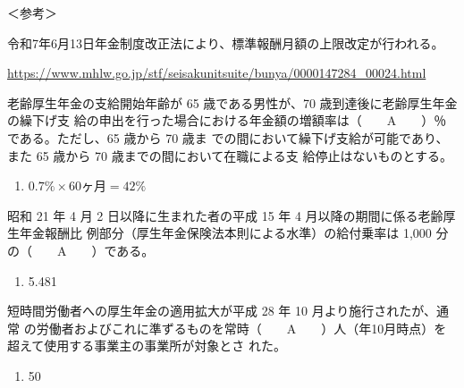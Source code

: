 \begin{explanationbox}
  ＜参考＞

  令和7年6月13日年金制度改正法により、標準報酬月額の上限改定が行われる。

  \url{https://www.mhlw.go.jp/stf/seisakunitsuite/bunya/0000147284_00024.html}
\end{explanationbox}

\begin{fillblank}[年金1 H28 問題1(2)F]
  老齢厚生年金の支給開始年齢が 65 歳である男性が、70 歳到達後に老齢厚生年金の繰下げ支
給の申出を行った場合における年金額の増額率は（　　A　　）％である。ただし、65 歳から 70 歳ま
での間において繰下げ支給が可能であり、また 65 歳から 70 歳までの間において在職による支
給停止はないものとする。
\end{fillblank}

\begin{answerbox}
  \begin{enumerate}[A: ]
    \item $0.7\% \times 60ヶ月 = 42\%$
  \end{enumerate}
\end{answerbox}

\begin{fillblank}[年金1 H28 問題1(2)G]
  昭和 21 年 4 月 2 日以降に生まれた者の平成 15 年 4 月以降の期間に係る老齢厚生年金報酬比
例部分（厚生年金保険法本則による水準）の給付乗率は 1,000 分の（　　A　　）である。
\end{fillblank}

\begin{answerbox}
  \begin{enumerate}[A: ]
    \item 5.481
  \end{enumerate}
\end{answerbox}

\begin{fillblank}[年金1 H28 問題1(2)I]
  短時間労働者への厚生年金の適用拡大が平成 28 年 10 月より施行されたが、通常
の労働者およびこれに準ずるものを常時（　　A　　）人（\the\year 年10月時点）を超えて使用する事業主の事業所が対象とさ
れた。
\end{fillblank}

\begin{answerbox}
  \begin{enumerate}[A: ]
    \item 50
  \end{enumerate}
\end{answerbox}

